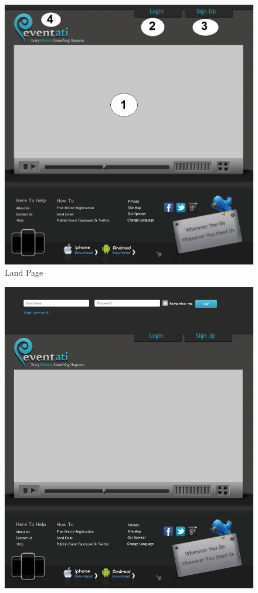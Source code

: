 \documentclass[12pt,a4paper,class,twoside,openany]{report}
\begin{document}
{\begin{figure}
\begin{center}
\includegraphics[height=6 in]{8-1}
\caption{Land Page}
\label{fg:8-1}
\end{center}
\end{figure}
\begin{figure}
\begin{center}
\includegraphics[height=6 in]{8-17}

\end{center}
\end{figure}}
\end{document}
